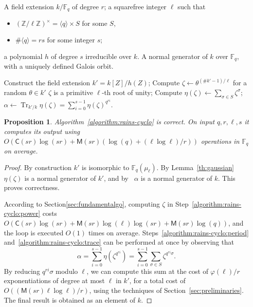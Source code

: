 \documentclass[12pt]{article}
\theoremstyle{plain}
\newtheorem{proposition}[theorem]{Proposition}
\theoremstyle{definition}
\DeclareMathOperator{\trace}{Tr} %
\def\Z{\ensuremath{\mathbb{Z}}}
\def\F{\ensuremath{\mathbb{F}}}
\def\MM{\ensuremath{\mathsf{M}}}
\def\CC{\ensuremath{\mathsf{C}}}
\def\euler{\ensuremath{\varphi}}
\newcounter{algorithm}
\begin{document}
\begin{algorithm}
  \label{algorithm:rains-cyclo}
  \begin{algorithmic}[1]
    \REQUIRE A field extension $k/\F_q$ of degree $r$; a squarefree
    integer $\ell$ such that
    \begin{itemize}
    \item $(\Z/\ell\Z)^\times = \langle q\rangle \times S$ for some $S$,
    \item $\#\langle q\rangle = rs$ for some integer $s$;
    \end{itemize}
    a polynomial $h$ of degree $s$ irreducible over $k$.
    \ENSURE A normal generator of $k$ over $\F_q$,
    with a uniquely defined Galois orbit.
    
    \STATE Construct the field extension $k'=k[Z]/h(Z)$;
    \REPEAT
    \STATE\label{algorithm:rains-cyclo:power} Compute $\zeta\leftarrow \theta^{(\#k'-1)/\ell}$ for a random $\theta\in k'$
    \UNTIL $\zeta$ is a primitive $\ell$-th root of unity;
    \STATE\label{algorithm:rains-cyclo:period} Compute $\eta(\zeta) \leftarrow \sum_{\sigma\in S}\zeta^\sigma$;
    \RETURN\label{algorithm:rains-cyclo:trace} $\alpha \leftarrow \trace_{k'/k}\eta(\zeta) = \sum_{i=0}^{s-1}\eta(\zeta)^{q^{ri}}$.
  \end{algorithmic}
\end{algorithm}

\begin{proposition}
  Algorithm~\ref{algorithm:rains-cyclo} is correct. On input
  $q,r,\ell,s$ it computes its output using
  $O(\CC(sr)\log(sr) + \MM(sr)(\log(q) + (\ell\log\ell)/r))$ operations in $\F_q$ on average.
\end{proposition}
\begin{proof}
  By construction $k'$ is isomorphic to $\F_q(\mu_\ell)$. By
  Lemma~\ref{th:gaussian} $\eta(\zeta)$ is a normal generator of $k'$,
  and by~\cite[Prop.~5.2.3.1]{mullen2013handbook} $\alpha$ is a
  normal generator of $k$. This proves correctness.

  According to Section\ref{sec:fundamentalgo}, computing $\zeta$
  in Step~\ref{algorithm:rains-cyclo:power}
  costs $O(\CC(sr)\log(sr)+\MM(sr)\log(\ell)\log(sr)+\MM(sr)\log(q))$,
  and the loop is executed $O(1)$ times on average. 
  Steps~\ref{algorithm:rains-cyclo:period}
  and~\ref{algorithm:rains-cyclo:trace} can be performed at once by
  observing that
  \[\alpha = \sum_{i=0}^{s-1}\eta(\zeta^{q^{ri}})= \sum_{i=0}^{s-1}\sum_{\sigma\in S}\zeta^{q^{ri}\sigma}.\]
  By reducing $q^{ri}\sigma$ modulo $\ell$, we can compute this sum at
  the cost of $\euler(\ell)/r$ exponentiations of degree at most
  $\ell$ in $k'$, for a total cost of
  $O((\MM(sr)\ell\log\ell)/r)$,
  using the techniques of Section~\ref{sec:preliminaries}.
  The final result is obtained as an element of $k$.
\end{proof}
\end{document}

